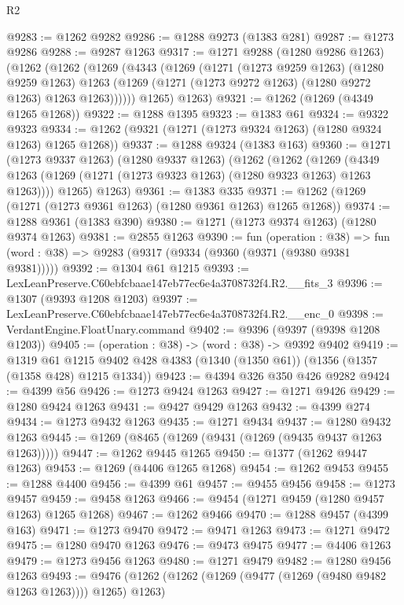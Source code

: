 \begin{lexlean}{R2}
\begin{coremodule}
@9283 := @1262 @9282
@9286 := @1288 @9273 (@1383 @281)
@9287 := @1273 @9286
@9288 := @9287 @1263
@9317 := @1271
    @9288
    (@1280 @9286 @1263)
    (@1262
      (@1262
        (@1269
          (@4343
            (@1269
              (@1271
                (@1273 @9259 @1263)
                (@1280 @9259 @1263)
                @1263
                (@1269 (@1271 (@1273 @9272 @1263) (@1280 @9272 @1263) @1263 @1263))))))
        @1265)
      @1263)
@9321 := @1262 (@1269 (@4349 @1265 @1268))
@9322 := @1288 @1395
@9323 := @1383 @61
@9324 := @9322 @9323
@9334 := @1262 (@9321 (@1271 (@1273 @9324 @1263) (@1280 @9324 @1263) @1265 @1268))
@9337 := @1288 @9324 (@1383 @163)
@9360 := @1271
    (@1273 @9337 @1263)
    (@1280 @9337 @1263)
    (@1262
      (@1262
        (@1269 (@4349 @1263 (@1269 (@1271 (@1273 @9323 @1263) (@1280 @9323 @1263) @1263 @1263))))
        @1265)
      @1263)
@9361 := @1383 @335
@9371 := @1262 (@1269 (@1271 (@1273 @9361 @1263) (@1280 @9361 @1263) @1265 @1268))
@9374 := @1288 @9361 (@1383 @390)
@9380 := @1271 (@1273 @9374 @1263) (@1280 @9374 @1263)
@9381 := @2855 @1263
@9390 := fun (operation : @38) =>
  fun (word : @38) => @9283 (@9317 (@9334 (@9360 (@9371 (@9380 @9381 @9381)))))
@9392 := @1304 @61 @1215
@9393 := LexLeanPreserve.C60ebfcbaae147eb77ec6e4a3708732f4.R2.__fits_3
@9396 := @1307 (@9393 @1208 @1203)
@9397 := LexLeanPreserve.C60ebfcbaae147eb77ec6e4a3708732f4.R2.__enc_0
@9398 := VerdantEngine.FloatUnary.command
@9402 := @9396 (@9397 (@9398 @1208 @1203))
@9405 := (operation : @38) -> (word : @38) -> @9392 @9402
@9419 := @1319
    @61
    @1215
    @9402
    @428
    @4383
    (@1340 (@1350 @61))
    (@1356 (@1357 (@1358 @428) @1215 @1334))
@9423 := @4394 @326 @350 @426 @9282
@9424 := @4399 @56
@9426 := @1273 @9424 @1263
@9427 := @1271 @9426
@9429 := @1280 @9424 @1263
@9431 := @9427 @9429 @1263
@9432 := @4399 @274
@9434 := @1273 @9432 @1263
@9435 := @1271 @9434
@9437 := @1280 @9432 @1263
@9445 := @1269 (@8465 (@1269 (@9431 (@1269 (@9435 @9437 @1263 @1263)))))
@9447 := @1262 @9445 @1265
@9450 := @1377 (@1262 @9447 @1263)
@9453 := @1269 (@4406 @1265 @1268)
@9454 := @1262 @9453
@9455 := @1288 @4400
@9456 := @4399 @61
@9457 := @9455 @9456
@9458 := @1273 @9457
@9459 := @9458 @1263
@9466 := @9454 (@1271 @9459 (@1280 @9457 @1263) @1265 @1268)
@9467 := @1262 @9466
@9470 := @1288 @9457 (@4399 @163)
@9471 := @1273 @9470
@9472 := @9471 @1263
@9473 := @1271 @9472
@9475 := @1280 @9470 @1263
@9476 := @9473 @9475
@9477 := @4406 @1263
@9479 := @1273 @9456 @1263
@9480 := @1271 @9479
@9482 := @1280 @9456 @1263
@9493 := @9476 (@1262 (@1262 (@1269 (@9477 (@1269 (@9480 @9482 @1263 @1263)))) @1265) @1263)

\end{coremodule}
\end{lexlean}
